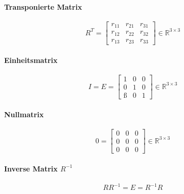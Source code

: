 \documentclass[a4paper, 11pt, accentcolor = tud3b]{tudreport}
\begin{document}
	        \paragraph{Transponierte Matrix}
	        \begin{equation*}
		        R ^ T =
		        \begin{bmatrix}
			        r _ { 1 1 } & r _ { 2 1 } & r _ { 3 1 } \\
			        r _ { 1 2 } & r _ { 2 2 } & r _ { 3 2 } \\
			        r _ { 1 3 } & r _ { 2 3 } & r _ { 3 3 }
		        \end{bmatrix}
		        \in \mathbb{R} ^ { 3 \times 3 }
	        \end{equation*}
	        
	        \paragraph{Einheitsmatrix}
	        \begin{equation*}
		        I = E =
		        \begin{bmatrix}
			        1 & 0 & 0 \\
			        0 & 1 & 0 \\
			        ß & 0 & 1
		        \end{bmatrix}
		        \in \mathbb{R} ^ { 3 \times 3 }
	        \end{equation*}
	        
	        \paragraph{Nullmatrix}
	        \begin{equation*}
		        0 =
		        \begin{bmatrix}
			        0 & 0 & 0 \\
			        0 & 0 & 0 \\
			        0 & 0 & 0
		        \end{bmatrix}
		        \in \mathbb{R} ^ { 3 \times 3 }
	        \end{equation*}
	        
	        \paragraph{Inverse Matrix \( R ^ { -1 } \)}
	        \begin{equation*}
		        R R ^ { -1 } = E = R ^ { -1 } R
	        \end{equation*}
	        
\end{document}
